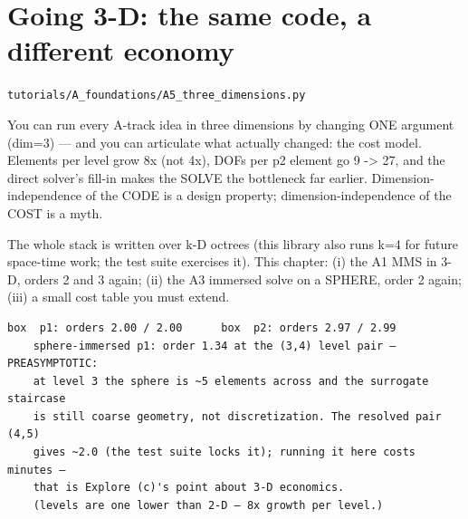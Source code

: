 \chapter{Going 3-D: the same code, a different economy}
\label{ch:A5_three_dimensions}
\noindent\texttt{tutorials/A\_foundations/A5\_three\_dimensions.py}\\[0.75em]
\begin{outcome}
You can run every A-track idea in three dimensions by
changing ONE argument (dim=3) — and you can articulate what actually
changed: the cost model. Elements per level grow 8x (not 4x), DOFs per p2
element go 9 -> 27, and the direct solver's fill-in makes the SOLVE the
bottleneck far earlier. Dimension-independence of the CODE is a design
property; dimension-independence of the COST is a myth.
\end{outcome}

The whole stack is written over k-D octrees (this library also
runs k=4 for future space-time work; the test suite exercises it). This
chapter: (i) the A1 MMS in 3-D, orders 2 and 3 again; (ii) the A3 immersed
solve on a SPHERE, order 2 again; (iii) a small cost table you must extend.

\begin{expected}
\begin{verbatim}
box  p1: orders 2.00 / 2.00      box  p2: orders 2.97 / 2.99
    sphere-immersed p1: order 1.34 at the (3,4) level pair — PREASYMPTOTIC:
    at level 3 the sphere is ~5 elements across and the surrogate staircase
    is still coarse geometry, not discretization. The resolved pair (4,5)
    gives ~2.0 (the test suite locks it); running it here costs minutes —
    that is Explore (c)'s point about 3-D economics.
    (levels are one lower than 2-D — 8x growth per level.)
\end{verbatim}
\end{expected}

